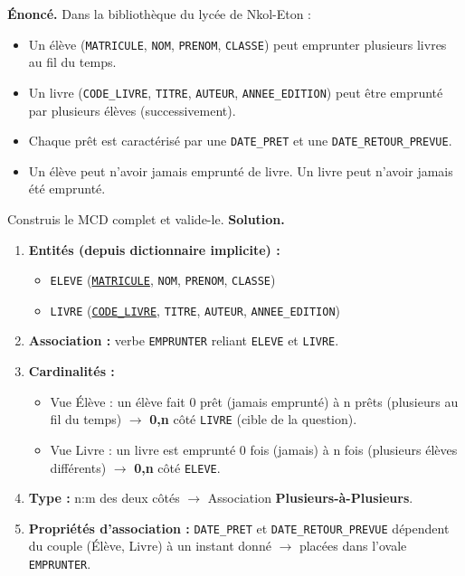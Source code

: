 \documentclass[11pt]{article}
\begin{document}
\begin{exoresolu}
\textbf{Énoncé.} Dans la bibliothèque du lycée de Nkol-Eton :
\begin{itemize}
  \item Un élève (\texttt{MATRICULE}, \texttt{NOM}, \texttt{PRENOM}, \texttt{CLASSE}) peut emprunter plusieurs livres au fil du temps.
  \item Un livre (\texttt{CODE\_LIVRE}, \texttt{TITRE}, \texttt{AUTEUR}, \texttt{ANNEE\_EDITION}) peut être emprunté par plusieurs élèves (successivement).
  \item Chaque prêt est caractérisé par une \texttt{DATE\_PRET} et une \texttt{DATE\_RETOUR\_PREVUE}.
  \item Un élève peut n'avoir jamais emprunté de livre. Un livre peut n'avoir jamais été emprunté.
\end{itemize}
Construis le MCD complet et valide-le.
\tcblower
\textbf{Solution.}
\begin{enumerate}
  \item \textbf{Entités (depuis dictionnaire implicite) :}
  \begin{itemize}
    \item \texttt{ELEVE} (\underline{\texttt{MATRICULE}}, \texttt{NOM}, \texttt{PRENOM}, \texttt{CLASSE})
    \item \texttt{LIVRE} (\underline{\texttt{CODE\_LIVRE}}, \texttt{TITRE}, \texttt{AUTEUR}, \texttt{ANNEE\_EDITION})
  \end{itemize}
  \item \textbf{Association :} verbe \texttt{EMPRUNTER} reliant \texttt{ELEVE} et \texttt{LIVRE}.
  \item \textbf{Cardinalités :}
  \begin{itemize}
    \item Vue Élève : un élève fait 0 prêt (jamais emprunté) à n prêts (plusieurs au fil du temps) $\rightarrow$ \textbf{0,n} côté \texttt{LIVRE} (cible de la question).
    \item Vue Livre : un livre est emprunté 0 fois (jamais) à n fois (plusieurs élèves différents) $\rightarrow$ \textbf{0,n} côté \texttt{ELEVE}.
  \end{itemize}
  \item \textbf{Type :} n:m des deux côtés $\rightarrow$ Association \textbf{Plusieurs-à-Plusieurs}.
  \item \textbf{Propriétés d'association :} \texttt{DATE\_PRET} et \texttt{DATE\_RETOUR\_PREVUE} dépendent du couple (Élève, Livre) à un instant donné $\rightarrow$ placées dans l'ovale \texttt{EMPRUNTER}.

\end{enumerate}
\end{exoresolu}
\end{document}
